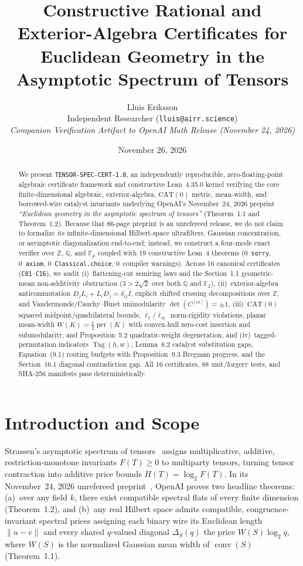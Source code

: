 \documentclass[10pt,twocolumn]{article}
\title{\textbf{Constructive Rational and Exterior-Algebra Certificates for Euclidean Geometry in the Asymptotic Spectrum of Tensors}}
\author{Lluis Eriksson\\
\small Independent Researcher \quad(\texttt{lluis@airr.science})\\
\small \textit{Companion Verification Artifact to OpenAI Math Release (November 24, 2026)}}
\date{November 26, 2026}
\begin{document}
\maketitle

\begin{abstract}
We present \texttt{TENSOR-SPEC-CERT-1.0}, an independently reproducible, zero-floating-point algebraic certificate framework and constructive Lean~4.35.0 kernel verifying the core finite-dimensional algebraic, exterior-algebra, $\mathrm{CAT}(0)$ metric, mean-width, and borrowed-wire catalyst invariants underlying OpenAI's November~24, 2026 preprint \emph{``Euclidean geometry in the asymptotic spectrum of tensors''} (Theorem~1.1 and Theorem~1.2). Because that 86-page preprint is an unrefereed release, we do not claim to formalize its infinite-dimensional Hilbert-space ultrafilters, Gaussian concentration, or asymptotic diagonalization end-to-end; instead, we construct a four-mode exact verifier over $\mathbb{Z}$, $\mathbb{Q}$, and $\mathbb{F}_p$ coupled with 19 constructive Lean~4 theorems (0~\texttt{sorry}, 0~\texttt{axiom}, 0~\texttt{Classical.choice}, 0~compiler warnings). Across 16 canonical certificates (\texttt{C01}--\texttt{C16}), we audit (i)~flattening-cut semiring laws and the Section~1.1 geometric-mean non-additivity obstruction ($3 > 2\sqrt{2}$ over both $\mathbb{Q}$ and $\mathbb{F}_2$), (ii)~exterior-algebra anticommutation $D_j L_i + L_i D_j = \delta_{ij} I$, explicit shifted crossing decompositions over $\mathbb{Z}$, and Vandermonde/Cauchy--Binet unimodularity $\det(C^{[m]}) = \pm 1$, (iii)~$\mathrm{CAT}(0)$ squared midpoint/quadrilateral bounds, $\ell_1$/$\ell_\infty$ norm-rigidity violations, planar mean-width $W(K)=\frac{1}{2}\operatorname{per}(K)$ with convex-hull zero-cost insertion and submodularity, and Proposition~5.2 quadratic-weight degeneration, and (iv)~tagged-permutation indicators $\operatorname{Tag}(h,w)$, Lemma~8.2 catalyst substitution gaps, Equation~(9.1) routing budgets with Proposition~9.3 Bregman progress, and the Section~16.1 diagonal contradiction gap. All 16 certificates, 88 unit/forgery tests, and SHA-256 manifests pass deterministically.
\end{abstract}

\section{Introduction and Scope}
Strassen's asymptotic spectrum of tensors~\cite{strassen1987relative,strassen1988asymptotic,wigderson2026asymptotic,christandl2023universal} assigns multiplicative, additive, restriction-monotone invariants $F(T) \ge 0$ to multiparty tensors, turning tensor contraction into additive price bounds $H(T) = \log_2 F(T)$. In its November~24, 2026 unrefereed preprint~\cite{openai2026tensorspectrum}, OpenAI proves two headline theorems: (a)~over any field $k$, there exist compatible spectral flats of every finite dimension (Theorem~1.2), and (b)~any real Hilbert space admits compatible, congruence-invariant spectral prices assigning each binary wire its Euclidean length $\|u-v\|$ and every shared $q$-valued diagonal $\Delta_S(q)$ the price $W(S)\log_2 q$, where $W(S)$ is the normalized Gaussian mean width of $\operatorname{conv}(S)$ (Theorem~1.1).
\end{document}
